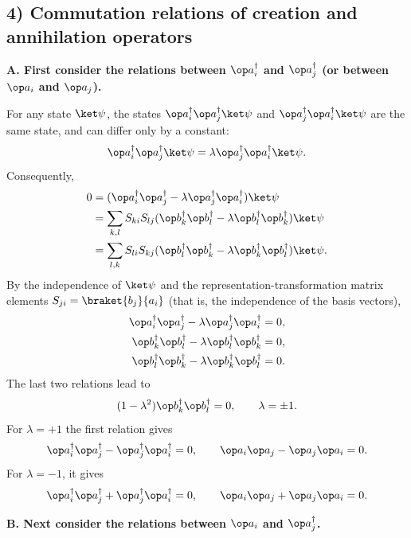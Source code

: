 \subsection*{4) Commutation relations of creation and annihilation operators}
\textbf{A. First consider the relations between $\op a_i^\dagger$ and $\op a_j^\dagger$ (or between $\op a_i$ and $\op a_j$).}

For any state $\ket\psi$, the states $\op a_i^\dagger\op a_j^\dagger\ket\psi$ and $\op a_j^\dagger\op a_i^\dagger\ket\psi$ are the same state, and can differ only by a constant:
\[\op a_i^\dagger\op a_j^\dagger\ket\psi
=\lambda\op a_j^\dagger\op a_i^\dagger\ket\psi.\]
Consequently,
\begin{align*}
0&=(\op a_i^\dagger\op a_j^\dagger-\lambda\op a_j^\dagger\op a_i^\dagger)\ket\psi\\
&=\sum_{k,l}S_{ki}S_{lj}
(\op b_k^\dagger\op b_l^\dagger-\lambda\op b_l^\dagger\op b_k^\dagger)\ket\psi\\
&=\sum_{l,k}S_{li}S_{kj}
(\op b_l^\dagger\op b_k^\dagger-\lambda\op b_k^\dagger\op b_l^\dagger)\ket\psi.
\end{align*}
By the independence of $\ket\psi$ and the representation-transformation matrix elements $S_{ji}=\braket{b_j}{a_i}$ (that is, the independence of the basis vectors),
\begin{align*}
\op a_i^\dagger\op a_j^\dagger-\lambda\op a_j^\dagger\op a_i^\dagger&=0,\\
\op b_k^\dagger\op b_l^\dagger-\lambda\op b_l^\dagger\op b_k^\dagger&=0,\\
\op b_l^\dagger\op b_k^\dagger-\lambda\op b_k^\dagger\op b_l^\dagger&=0.
\end{align*}
The last two relations lead to
\[(1-\lambda^2)\op b_k^\dagger\op b_l^\dagger=0,\qquad\lambda=\pm1.\]
For $\lambda=+1$ the first relation gives
\[\op a_i^\dagger\op a_j^\dagger-\op a_j^\dagger\op a_i^\dagger=0,\qquad
\op a_i\op a_j-\op a_j\op a_i=0.\]
For $\lambda=-1$, it gives
\[\op a_i^\dagger\op a_j^\dagger+\op a_j^\dagger\op a_i^\dagger=0,\qquad
\op a_i\op a_j+\op a_j\op a_i=0.\]

\textbf{B. Next consider the relations between $\op a_i$ and $\op a_j^\dagger$.}

